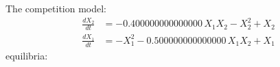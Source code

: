 \documentclass{article}
\begin{document}
The competition model:
\[\begin{align*}
\frac{dX_{2}}{dt} &= -0.400000000000000 \, X_{1} X_{2} - X_{2}^{2} + X_{2}\\
\frac{dX_{1}}{dt} &= -X_{1}^{2} - 0.500000000000000 \, X_{1} X_{2} + X_{1}
\end{align*}\]
equilibria: 
\end{document}
